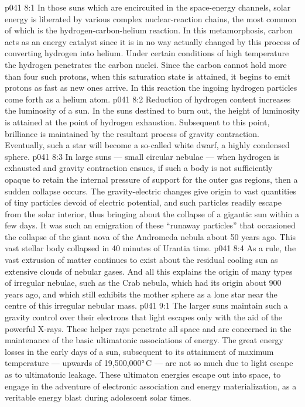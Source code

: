 \vs p041 8:1 In those suns which are encircuited in the space\hyp{}energy channels, solar energy is liberated by various complex nuclear\hyp{}reaction chains, the most common of which is the hydrogen\hyp{}carbon\hyp{}helium reaction. In this metamorphosis, carbon acts as an energy catalyst since it is in no way actually changed by this process of converting hydrogen into helium. Under certain conditions of high temperature the hydrogen penetrates the carbon nuclei. Since the carbon cannot hold more than four such protons, when this saturation state is attained, it begins to emit protons as fast as new ones arrive. In this reaction the ingoing hydrogen particles come forth as a helium atom.
\vs p041 8:2 \pc Reduction of hydrogen content increases the luminosity of a sun. In the suns destined to burn out, the height of luminosity is attained at the point of hydrogen exhaustion. Subsequent to this point, brilliance is maintained by the resultant process of gravity contraction. Eventually, such a star will become a so\hyp{}called white dwarf, a highly condensed sphere.
\vs p041 8:3 \pc In large suns --- small circular nebulae --- when hydrogen is exhausted and gravity contraction ensues, if such a body is not sufficiently opaque to retain the internal pressure of support for the outer gas regions, then a sudden collapse occurs. The gravity\hyp{}electric changes give origin to vast quantities of tiny particles devoid of electric potential, and such particles readily escape from the solar interior, thus bringing about the collapse of a gigantic sun within a few days. It was such an emigration of these “runaway particles” that occasioned the collapse of the giant nova of the Andromeda nebula about 50 years ago. This vast stellar body collapsed in 40 minutes of Urantia time.
\vs p041 8:4 As a rule, the vast extrusion of matter continues to exist about the residual cooling sun as extensive clouds of nebular gases. And all this explains the origin of many types of irregular nebulae, such as the Crab nebula, which had its origin about 900 years ago, and which still exhibits the mother sphere as a lone star near the centre of this irregular nebular mass.
\vs p041 9:1 The larger suns maintain such a gravity control over their electrons that light escapes only with the aid of the powerful X\hyp{}rays. These helper rays penetrate all space and are concerned in the maintenance of the basic ultimatonic associations of energy. The great energy losses in the early days of a sun, subsequent to its attainment of maximum temperature --- upwards of 19,500,000°\,C --- are not so much due to light escape as to ultimatonic leakage. These ultimaton energies escape out into space, to engage in the adventure of electronic association and energy materialization, as a veritable energy blast during adolescent solar times.
